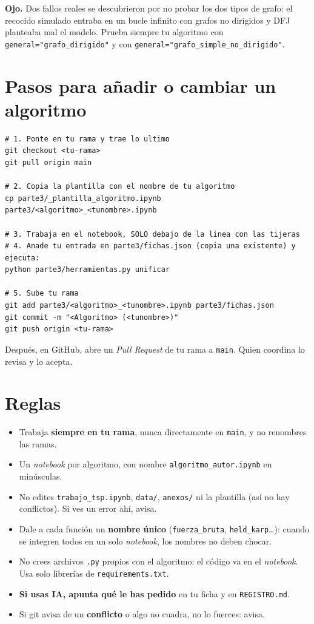 \documentclass[11pt,a4paper,twoside,openany]{report}
\newcommand{\aviso}[1]{\par\vspace{0.5em}\noindent\begin{minipage}{\linewidth}\noindent\colorbox{amarillo!18}{\parbox{\dimexpr\linewidth-2\fboxsep}{\small\textbf{Ojo.} #1}}\end{minipage}\par\vspace{0.5em}}
\begin{document}
\aviso{Dos fallos reales se descubrieron por no probar los dos tipos de grafo: el recocido simulado entraba en un bucle infinito con grafos no dirigidos y DFJ planteaba mal el modelo. Prueba siempre tu algoritmo con \texttt{general="grafo\_dirigido"} y con \texttt{general="grafo\_simple\_no\_dirigido"}.}

\section{Pasos para añadir o cambiar un algoritmo}

\begin{lstlisting}
# 1. Ponte en tu rama y trae lo ultimo
git checkout <tu-rama>
git pull origin main

# 2. Copia la plantilla con el nombre de tu algoritmo
cp parte3/_plantilla_algoritmo.ipynb parte3/<algoritmo>_<tunombre>.ipynb

# 3. Trabaja en el notebook, SOLO debajo de la linea con las tijeras
# 4. Anade tu entrada en parte3/fichas.json (copia una existente) y ejecuta:
python parte3/herramientas.py unificar

# 5. Sube tu rama
git add parte3/<algoritmo>_<tunombre>.ipynb parte3/fichas.json
git commit -m "<Algoritmo> (<tunombre>)"
git push origin <tu-rama>
\end{lstlisting}
Después, en GitHub, abre un \emph{Pull Request} de tu rama a \texttt{main}. Quien coordina lo revisa y lo acepta.

\section{Reglas}

\begin{itemize}
  \item Trabaja \textbf{siempre en tu rama}, nunca directamente en \texttt{main}, y no renombres las ramas.
  \item Un \emph{notebook} por algoritmo, con nombre \texttt{algoritmo\_autor.ipynb} en minúsculas.
  \item No edites \texttt{trabajo\_tsp.ipynb}, \texttt{data/}, \texttt{anexos/} ni la plantilla (así no hay conflictos). Si ves un error ahí, avisa.
  \item Dale a cada función un \textbf{nombre único} (\texttt{fuerza\_bruta}, \texttt{held\_karp}\dots): cuando se integren todos en un solo \emph{notebook}, los nombres no deben chocar.
  \item No crees archivos \texttt{.py} propios con el algoritmo: el código va en el \emph{notebook}. Usa solo librerías de \texttt{requirements.txt}.
  \item \textbf{Si usas IA, apunta qué le has pedido} en tu ficha y en \texttt{REGISTRO.md}.
  \item Si git avisa de un \textbf{conflicto} o algo no cuadra, no lo fuerces: avisa.
\end{itemize}
\end{document}
